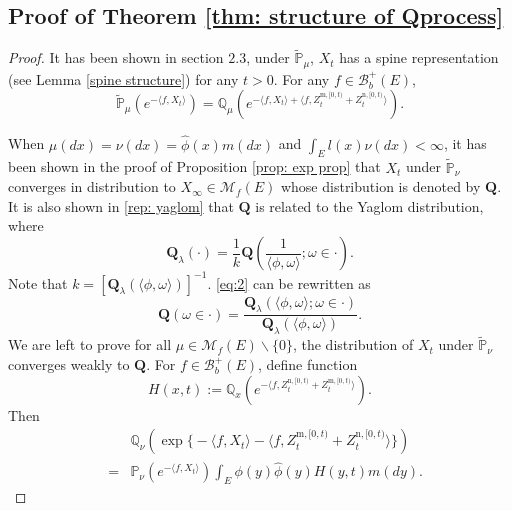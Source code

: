\documentclass[12pt,a4paper]{amsart}
\numberwithin{equation}{section}
\theoremstyle{plain}
\theoremstyle{definition}
\theoremstyle{remark}
\begin{document}
\subsection{Proof of Theorem \ref{thm: structure of Qprocess}}
\begin{proof}
It has been shown in section $2.3$, under $\widetilde{\mathbb P}_\mu$,  $X_t$ has a spine representation
(see Lemma \ref{spine structure}) for any $t>0$.  For any $f\in\mathcal B_b^+(E)$,
\[
\widetilde {\mathbb P}_{\mu}\left(e^{-\langle f, X_t\rangle }\right)=\mathbb Q_{\mu}\left(e^{-\langle f, X_t\rangle+\langle f, Z^{{\mathrm m},[0,t)}_t+Z^{{\mathrm n},[0,t)}_t\rangle }\right).
\]


When $\mu(dx)=\nu(dx)=\hat\phi(x)m(dx)$ and $\int_El(x)\nu(dx)<\infty$, it has been shown in the proof of Proposition \ref{prop: exp prop} that
$X_t$ under $\widetilde {\mathbb P}_{\nu}$ converges in distribution to $X_\infty\in\mathcal M_f(E)$ whose distribution is denoted by $\mathbf Q$.
It is also shown in \eqref{rep: yaglom} that $\mathbf Q$ is related to the Yaglom distribution, where
\begin{equation}\label{eq:2}
\mathbf Q_\lambda(\cdot)=\dfrac{1}{k}{\mathbf Q}\left(\dfrac{1}{\langle\phi, \omega\rangle }; \omega\in\cdot\right).
\end{equation}
Note that $k=[\mathbf Q_\lambda(\langle\phi, \omega\rangle)]^{-1}$. \eqref{eq:2} can be rewritten as
\begin{equation}\label{eq size bias}
{\mathbf Q}\left(\omega\in\cdot\right)=\dfrac{\mathbf Q_\lambda(\langle\phi, \omega\rangle; \omega\in \cdot)}{\mathbf Q_\lambda(\langle\phi, \omega\rangle)}.
\end{equation}
We are left to prove for all $\mu\in\mathcal M_f(E)\backslash\{0\}$, the distribution of $X_t$ under $\widetilde {\mathbb P}_{\nu}$ converges weakly to $\mathbf Q$.  For $f\in\mathcal B_b^+(E)$, define function
\begin{equation}\label{def: H}
H(x,t):={\mathbb Q}_x\left(e^{-\langle f, Z^{\mathrm n, [0,t)}_{t} + Z^{\mathrm m, [0,t)}_{t}\rangle }\right).
\end{equation}
Then
\begin{eqnarray*}
&&\mathbb Q_\nu\left(\exp\Big\{-\langle f, X_t\rangle-\langle f, Z^{{\mathrm m},[0,t)}_t+Z^{{\mathrm n},[0,t)}_t\rangle \Big\}\right)\\
&=&\mathbb P_\nu\left(e^{-\langle f, X_t\rangle}\right)\int_E\phi(y)\hat\phi(y)H(y,t)m(dy).
\end{eqnarray*}

\end{proof}
\end{document}
